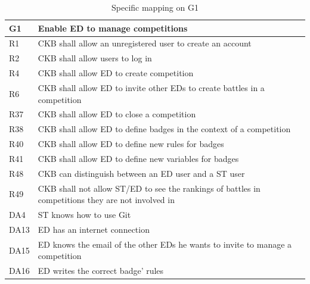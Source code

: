   \begin{table}[H]
    \begin{tabular}{|l|p{12cm}| }
      \hline
      \textbf{G1} & \textbf{Enable ED to manage competitions}      \\
      \hline
      R1 & CKB shall allow an unregistered user to create an account \\
      \hline
      R2 & CKB shall allow users to log in \\
      \hline
      R4 & CKB shall allow ED to create competition \\
      \hline
      R6 & CKB shall allow ED to invite other EDs to create battles in a competition \\
      \hline
      R37 & CKB shall allow ED to close a competition \\
      \hline
      R38 & CKB shall allow ED to define badges in the context of a competition \\
      \hline
      R40 & CKB shall allow ED to define new rules for badges \\
      \hline
      R41 & CKB shall allow ED to define new variables for badges \\
      \hline
      R48 & CKB can distinguish between an ED user and a ST user \\
      \hline
      R49 & CKB shall not allow ST/ED to see the rankings of battles in competitions they are not involved in \\
      \hline
      DA4 & ST knows how to use Git \\
      \hline
      DA13 & ED has an internet connection \\
      \hline
      DA15 & ED knows the email of the other EDs he wants to invite to manage a competition \\
      \hline
      DA16 & ED writes the correct badge’ rules \\
      \hline
    \end{tabular}
    \caption{Specific mapping on G1}
    \label{tab:mappingG1}
  \end{table}

